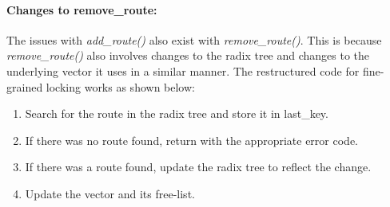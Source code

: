 \documentclass{article}
\begin{document}
\paragraph{Changes to remove\_route:}
The issues with \emph{add\_route()} also exist with \emph{remove\_route()}. This is because \emph{remove\_route()} also involves changes to the radix tree and changes to the underlying vector it uses in a similar manner. The restructured code for fine-grained locking works as shown below:
\begin{enumerate}
\item Search for the route in the radix tree and store it in last\_key.
\item If there was no route found, return with the appropriate error code.
\item If there was a route found, update the radix tree to reflect the change. 
\item Update the vector and its free-list.
\end{enumerate}
\end{document}
